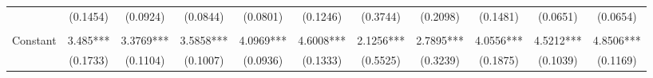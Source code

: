 \begin{table}[htbp]
{\begin{tabular}{lcccccccccc}
& (0.1454) & (0.0924) & (0.0844) & (0.0801) & (0.1246) & (0.3744) & (0.2098) & (0.1481) & (0.0651) & (0.0654) \\ 
\text{} &&&&&&&&&&\\
Constant & 3.485*** & 3.3769*** & 3.5858*** & 4.0969*** & 4.6008*** & 2.1256*** & 2.7895*** & 4.0556*** & 4.5212*** & 4.8506*** \\
& (0.1733) & (0.1104) & (0.1007) & (0.0936) & (0.1333) & (0.5525) & (0.3239) & (0.1875) & (0.1039) & (0.1169) \\ 
\bottomrule
\end{tabular}
}
\end{table}